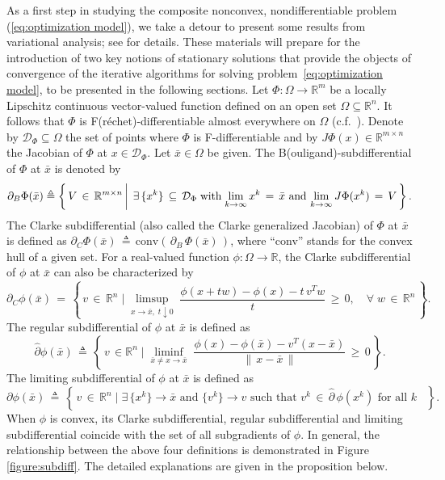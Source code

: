 \documentclass{siamart}
\newcommand{\wh}{\widehat}
\begin{document}
As a first step in studying the composite nonconvex, nondifferentiable problem (\ref{eq:optimization model}),
we take a detour to present some results from variational analysis; %
see \cite{RockafellarRWets98}
for details.  These materials will prepare for
the introduction of two key notions of stationary solutions that provide the objects of convergence of the iterative
algorithms for solving problem~\eqref{eq:optimization model}, to be presented in the following sections.
Let $\Phi:\Omega\to \mathbb{R}^m$ be a locally Lipschitz continuous vector-valued function defined on an open set $\Omega \subseteq \mathbb{R}^n$.
It follows that $\Phi$ is F(r{\'e}chet)-differentiable almost everywhere on $\Omega$ (c.f.~\cite[Theorem 9.60]{RockafellarRWets98}).
Denote by $\mathcal{D}_{\Phi} \subseteq \Omega$ the set of points where $\Phi$ is F-differentiable and by $J\Phi(x)\in \mathbb{R}^{m\times n}$
the Jacobian of $\Phi$ at $x\in \mathcal{D}_{\Phi}$.  Let $\bar{x} \in \Omega$ be given.
The B(ouligand)-subdifferential of $\Phi$ at $\bar{x}$ is denoted by
\[
\partial_B \Phi(\bar{x}) \triangleq  \left\{ \, V \, \in \, \mathbb{R}^{m\times n} \, \bigg| \; \, \exists \,
\{x^k\}\,\subseteq\, \mathcal{D}_\Phi \;{\rm with}\; \displaystyle{
\lim_{k \to \infty}
} \, x^k \, = \, \bar{x} \mbox{ and } \displaystyle{
\lim_{k \to \infty}
} \, J\Phi(x^k) \, = \,  V \, \right\}.
\] %
The Clarke subdifferential (also called the Clarke generalized Jacobian) of $\Phi$ at $\bar{x}$ is defined as $
\partial_C \Phi(\bar{x}) \,\triangleq \,  \mbox{conv}\left(\,\partial_B\,\Phi(\bar{x})\,\right)$,
where ``conv'' stands for the convex hull of a given set.  For a real-valued function $\phi : \Omega \to \mathbb{R}$,
the Clarke subdifferential of $\phi$ at $\bar{x}$ can also be characterized by
 \[
\partial_C \phi(\bar{x})  \,= \, \left\{ \, v \, \in \, \mathbb{R}^n \; \bigg| \;
\limsup_{x\to\bar{x},\; t\downarrow 0}  \; \frac{\phi(x+tw) - \phi(x)-t\,v^Tw}{t} \, \geq \, 0, \quad \forall \; w \, \in \, \mathbb{R}^n \, \right\}.
\]
The regular subdifferential of $\phi$ at $\bar{x}$ is defined as
\[
\wh{\partial} \phi(\bar{x}) \, \triangleq \, \left\{ \, v \, \in \mathbb{R}^n \; \bigg| \;
\liminf_{\bar{x} \neq x\to\bar{x}} \; \frac{\phi(x) - \phi(\bar{x})-v^T(x-\bar{x})}{\| \, x-\bar{x} \, \|} \, \geq \, 0 \, \right\}.
\]
The limiting subdifferential of $\phi$ at $\bar{x}$ is defined as
\[
\partial \phi(\bar{x}) \, \triangleq \, \left\{ \, v \, \in \, \mathbb{R}^n \; \bigg| \; \exists \, \{ x^k \} \to \bar{x}
\mbox{ and } \{ v^k \} \to v \mbox{ such that } v^k \, \in \, \wh{\partial} \, \phi(x^k) \mbox{ for all $k$ } \, \right\}.
\] %
When $\phi$ is convex, its Clarke subdifferential, regular subdifferential and limiting subdifferential
coincide with the set of all subgradients of $\phi$.  In general, the relationship between the above four
definitions is demonstrated in Figure \ref{figure:subdiff}.  The detailed explanations are given in the proposition below.
\end{document}
